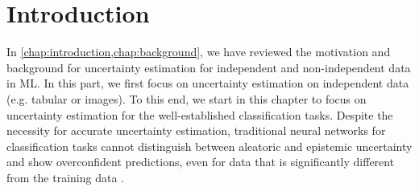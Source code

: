 \section{Introduction}
\label{sec:introduction_006}

In \cref{chap:introduction,chap:background}, we have reviewed the motivation and background for uncertainty estimation for independent and non-independent data in ML. In this part, we first focus on uncertainty estimation on independent data (e.g. tabular or images). To this end, we start in this chapter to focus on uncertainty estimation for the well-established classification tasks. Despite the necessity for accurate uncertainty estimation, traditional neural networks for classification tasks cannot distinguish between aleatoric and epistemic uncertainty and show overconfident predictions, even for data that is significantly different from the training data \cite{ensembles} \cite{calibration-network}. 


